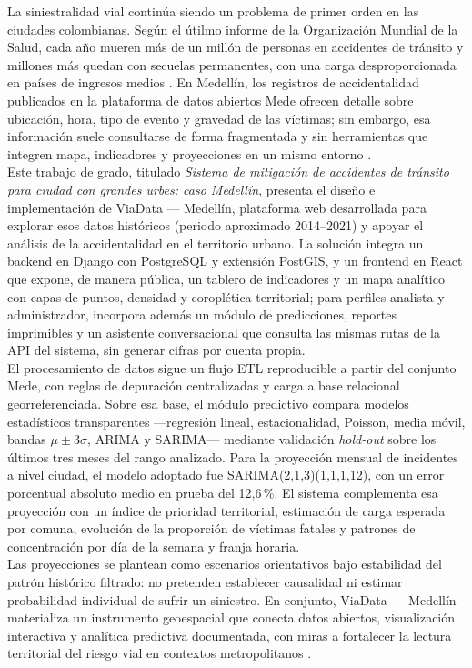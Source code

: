 La siniestralidad vial continúa siendo un problema de primer orden en las ciudades colombianas. Según el útilmo informe de la Organización Mundial de la Salud, cada año mueren más de un millón de personas en accidentes de tránsito y millones más quedan con secuelas permanentes, con una carga desproporcionada en países de ingresos medios \cite{oms2024}. En Medellín, los registros de accidentalidad publicados en la plataforma de datos abiertos Mede ofrecen detalle sobre ubicación, hora, tipo de evento y gravedad de las víctimas; sin embargo, esa información suele consultarse de forma fragmentada y sin herramientas que integren mapa, indicadores y proyecciones en un mismo entorno \cite{mina2024,parraga2024}.\\
Este trabajo de grado, titulado \textit{Sistema de mitigación de accidentes de tránsito para ciudad con grandes urbes: caso Medellín}, presenta el diseño e implementación de ViaData — Medellín, plataforma web desarrollada para explorar esos datos históricos (periodo aproximado 2014--2021) y apoyar el análisis de la accidentalidad en el territorio urbano. La solución integra un backend en Django con PostgreSQL y extensión PostGIS, y un frontend en React que expone, de manera pública, un tablero de indicadores y un mapa analítico con capas de puntos, densidad y coroplética territorial; para perfiles analista y administrador, incorpora además un módulo de predicciones, reportes imprimibles y un asistente conversacional que consulta las mismas rutas de la API del sistema, sin generar cifras por cuenta propia.\\
El procesamiento de datos sigue un flujo ETL reproducible a partir del conjunto Mede, con reglas de depuración centralizadas y carga a base relacional georreferenciada. Sobre esa base, el módulo predictivo compara modelos estadísticos transparentes ---regresión lineal, estacionalidad, Poisson, media móvil, bandas $\mu \pm 3\sigma$, ARIMA y SARIMA--- mediante validación \textit{hold-out} sobre los últimos tres meses del rango analizado. Para la proyección mensual de incidentes a nivel ciudad, el modelo adoptado fue SARIMA(2,1,3)(1,1,1,12), con un error porcentual absoluto medio en prueba del 12,6\,\%. El sistema complementa esa proyección con un índice de prioridad territorial, estimación de carga esperada por comuna, evolución de la proporción de víctimas fatales y patrones de concentración por día de la semana y franja horaria.\\
Las proyecciones se plantean como escenarios orientativos bajo estabilidad del patrón histórico filtrado: no pretenden establecer causalidad ni estimar probabilidad individual de sufrir un siniestro. En conjunto, ViaData — Medellín materializa un instrumento geoespacial que conecta datos abiertos, visualización interactiva y analítica predictiva documentada, con miras a fortalecer la lectura territorial del riesgo vial en contextos metropolitanos \cite{monar2025}.

